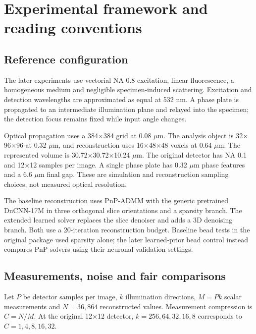 \section{Experimental framework and reading conventions}

\subsection{Reference configuration}

The later experiments use vectorial NA-0.8 excitation, linear fluorescence, a homogeneous medium and negligible specimen-induced scattering. Excitation and detection wavelengths are approximated as equal at 532 nm. A phase plate is propagated to an intermediate illumination plane and relayed into the specimen; the detection focus remains fixed while input angle changes.

Optical propagation uses a 384\ensuremath{\times}384 grid at 0.08 \ensuremath{\mu}m. The analysis object is 32\ensuremath{\times}96\ensuremath{\times}96 at 0.32 \ensuremath{\mu}m, and reconstruction uses 16\ensuremath{\times}48\ensuremath{\times}48 voxels at 0.64 \ensuremath{\mu}m. The represented volume is 30.72\ensuremath{\times}30.72\ensuremath{\times}10.24 \ensuremath{\mu}m. The original detector has NA 0.1 and 12\ensuremath{\times}12 samples per image. A single phase plate has 0.32 \ensuremath{\mu}m phase features and a 6.6 \ensuremath{\mu}m final gap. These are simulation and reconstruction sampling choices, not measured optical resolution.

The baseline reconstruction uses PnP-ADMM with the generic pretrained DnCNN-17M in three orthogonal slice orientations and a sparsity branch. The extended learned solver replaces the slice denoiser and adds a 3D denoising branch. Both use a 20-iteration reconstruction budget. Baseline bead tests in the original package used sparsity alone; the later learned-prior bead control instead compares PnP solvers using their neuronal-validation settings.

\subsection{Measurements, noise and fair comparisons}

Let \(P\) be detector samples per image, \(k\) illumination directions, \(M=Pk\) scalar measurements and \(N=36{,}864\) reconstructed values. Measurement compression is \(C=N/M\). At the original 12\ensuremath{\times}12 detector, \(k=256,64,32,16,8\) corresponds to \(C=1,4,8,16,32\).

